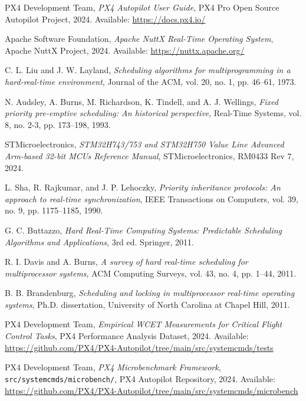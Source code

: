 \documentclass[11pt,a4paper]{article}
\theoremstyle{definition}
\theoremstyle{remark}
\begin{document}

\begin{thebibliography}{14}

PX4 Development Team,
\textit{PX4 Autopilot User Guide},
PX4 Pro Open Source Autopilot Project, 2024.
Available: \url{https://docs.px4.io/}

Apache Software Foundation,
\textit{Apache NuttX Real-Time Operating System},
Apache NuttX Project, 2024.
Available: \url{https://nuttx.apache.org/}

C. L. Liu and J. W. Layland,
\textit{Scheduling algorithms for multiprogramming in a hard-real-time environment},
Journal of the ACM, vol. 20, no. 1, pp. 46--61, 1973.

N. Audsley, A. Burns, M. Richardson, K. Tindell, and A. J. Wellings,
\textit{Fixed priority pre-emptive scheduling: An historical perspective},
Real-Time Systems, vol. 8, no. 2-3, pp. 173--198, 1993.

STMicroelectronics,
\textit{STM32H743/753 and STM32H750 Value Line Advanced Arm-based 32-bit MCUs Reference Manual},
STMicroelectronics, RM0433 Rev 7, 2024.

L. Sha, R. Rajkumar, and J. P. Lehoczky,
\textit{Priority inheritance protocols: An approach to real-time synchronization},
IEEE Transactions on Computers, vol. 39, no. 9, pp. 1175--1185, 1990.

G. C. Buttazzo,
\textit{Hard Real-Time Computing Systems: Predictable Scheduling Algorithms and Applications},
3rd ed. Springer, 2011.

R. I. Davis and A. Burns,
\textit{A survey of hard real-time scheduling for multiprocessor systems},
ACM Computing Surveys, vol. 43, no. 4, pp. 1--44, 2011.

B. B. Brandenburg,
\textit{Scheduling and locking in multiprocessor real-time operating systems},
Ph.D. dissertation, University of North Carolina at Chapel Hill, 2011.

PX4 Development Team,
\textit{Empirical WCET Measurements for Critical Flight Control Tasks},
PX4 Performance Analysis Dataset, 2024.
Available: \url{https://github.com/PX4/PX4-Autopilot/tree/main/src/systemcmds/tests}

PX4 Development Team,
\textit{PX4 Microbenchmark Framework},
\texttt{src/systemcmds/microbench/}, PX4 Autopilot Repository, 2024.
Available: \url{https://github.com/PX4/PX4-Autopilot/tree/main/src/systemcmds/microbench}


\end{thebibliography}
\end{document}
